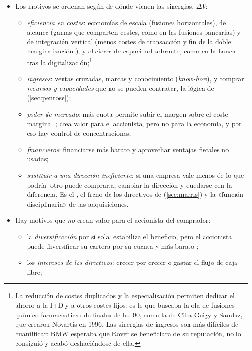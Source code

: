 \documentclass[11pt]{article}
\begin{document}
\begin{itemize}
\item Los motivos se ordenan según de dónde vienen las sinergias, $\Delta V$:
  \begin{itemize}
  \item \emph{eficiencia en costes}: economías de escala (fusiones horizontales), de alcance (gamas que comparten costes, como en las fusiones bancarias) y de integración vertical (menos costes de transacción y fin de la doble marginalización ); y el cierre de capacidad sobrante, como en la banca tras la digitalización;\footnote{La reducción de costes duplicados y la especialización permiten dedicar el ahorro a la I+D y a otros costes fijos: es lo que buscaba la ola de fusiones químico-farmacéuticas de finales de los 90, como la de Ciba-Geigy y Sandoz, que crearon Novartis en 1996. Las sinergias de ingresos son más difíciles de cuantificar: BMW esperaba que Rover se beneficiara de su reputación, no lo consiguió y acabó deshaciéndose de ella.}
  \item \emph{ingresos}: ventas cruzadas, marcas y conocimiento (\emph{know-how}), y comprar \emph{recursos y capacidades} que no se pueden contratar, la lógica de  (\ref{sec:penrose});
  \item \emph{poder de mercado}: más cuota permite subir el margen sobre el coste marginal ; crea valor para el accionista, pero no para la economía, y por eso hay control de concentraciones;
  \item \emph{financieros}: financiarse más barato y aprovechar ventajas fiscales no usadas;
  \item \emph{sustituir a una dirección ineficiente}: si una empresa vale menos de lo que podría, otro puede comprarla, cambiar la dirección y quedarse con la diferencia. Es el \nocite{Manne1965Mergers}, el freno de los directivos de  (\ref{sec:marris}) y la «función disciplinaria» de las adquisiciones.
  \end{itemize}
\item Hay motivos que \emph{no} crean valor para el accionista del comprador:
  \begin{itemize}
  \item la \emph{diversificación} por sí sola: estabiliza el beneficio, pero el accionista puede diversificar su cartera por su cuenta y más barato ;
  \item los \emph{intereses de los directivos}: crecer por crecer\nocite{Marris1964Economic} o gastar el flujo de caja libre\nocite{Jensen1986Agency};

\end{itemize}
\end{itemize}
\end{document}
